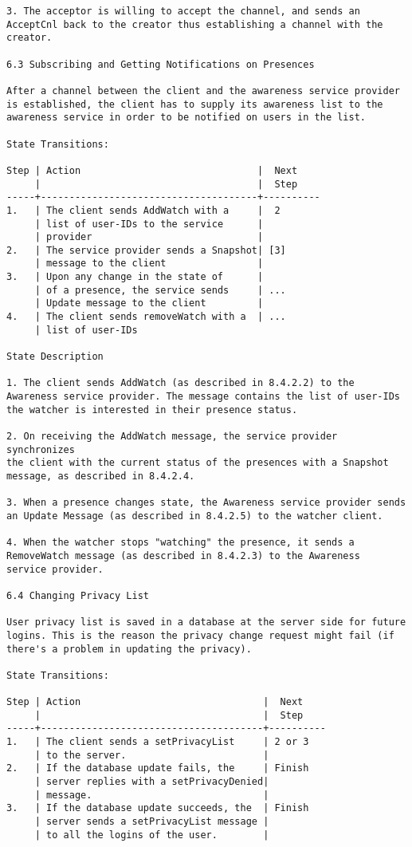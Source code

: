 \documentclass[titlepage,oneside]{book}
\begin{document}
\begin{verbatim}
3. The acceptor is willing to accept the channel, and sends an
AcceptCnl back to the creator thus establishing a channel with the
creator.

6.3 Subscribing and Getting Notifications on Presences

After a channel between the client and the awareness service provider
is established, the client has to supply its awareness list to the
awareness service in order to be notified on users in the list.

State Transitions:

Step | Action                               |  Next
     |                                      |  Step
-----+--------------------------------------+----------
1.   | The client sends AddWatch with a     |  2
     | list of user-IDs to the service      |
     | provider                             |
2.   | The service provider sends a Snapshot| [3]
     | message to the client                |
3.   | Upon any change in the state of      |
     | of a presence, the service sends     | ...
     | Update message to the client         |
4.   | The client sends removeWatch with a  | ...
     | list of user-IDs

State Description

1. The client sends AddWatch (as described in 8.4.2.2) to the
Awareness service provider. The message contains the list of user-IDs
the watcher is interested in their presence status.

2. On receiving the AddWatch message, the service provider synchronizes
the client with the current status of the presences with a Snapshot
message, as described in 8.4.2.4.

3. When a presence changes state, the Awareness service provider sends
an Update Message (as described in 8.4.2.5) to the watcher client.

4. When the watcher stops "watching" the presence, it sends a
RemoveWatch message (as described in 8.4.2.3) to the Awareness
service provider.

6.4 Changing Privacy List

User privacy list is saved in a database at the server side for future
logins. This is the reason the privacy change request might fail (if
there's a problem in updating the privacy).

State Transitions:

Step | Action                                |  Next
     |                                       |  Step
-----+---------------------------------------+----------
1.   | The client sends a setPrivacyList     | 2 or 3
     | to the server.                        |
2.   | If the database update fails, the     | Finish
     | server replies with a setPrivacyDenied|
     | message.                              |
3.   | If the database update succeeds, the  | Finish
     | server sends a setPrivacyList message |
     | to all the logins of the user.        |


\end{verbatim}
\end{document}

